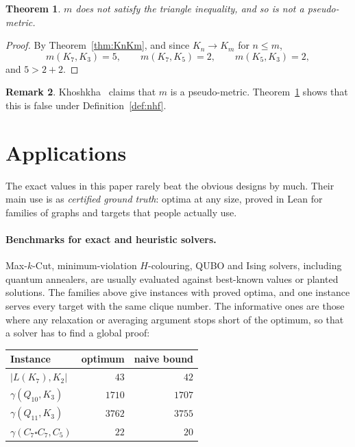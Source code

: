 \documentclass{article}
\newtheorem{theorem}{Theorem}[section]
\theoremstyle{definition}
\newtheorem{remark}[theorem]{Remark}
\begin{document}
\begin{theorem}
\label{thm:no_triangle}
$m$ does not satisfy the triangle inequality, and so is not a pseudo-metric.
\end{theorem}

\begin{proof}
By Theorem~\ref{thm:KnKm}, and since $K_n\to K_m$ for $n\le m$,
\[
  m(K_7,K_3)=5,\qquad m(K_7,K_5)=2,\qquad m(K_5,K_3)=2,
\]
and $5>2+2$.
\end{proof}

\begin{remark}
Khoshkha~\cite{khoshkha2005} claims that $m$ is a pseudo-metric.
Theorem~\ref{thm:no_triangle} shows that this is false under
Definition~\ref{def:nhf}.
\end{remark}

\section{Applications}
\label{sec:applications}

The exact values in this paper rarely beat the obvious designs by much.  Their
main use is as \emph{certified ground truth}: optima at any size, proved in Lean
for families of graphs and targets that people actually use.

\paragraph{Benchmarks for exact and heuristic solvers.}
Max-$k$-Cut, minimum-violation $H$-colouring, QUBO and Ising solvers, including
quantum annealers, are usually evaluated against best-known values or planted
solutions.  The families above give instances with proved optima, and one
instance serves every target with the same clique number.  The informative ones
are those where any relaxation or averaging argument stops short of the optimum,
so that a solver has to find a global proof:

\begin{center}
\begin{tabular}{lrr}
\toprule
Instance & optimum & naive bound \\
\midrule
$|L(K_7),K_2|$ & $43$ & $42$ \\
$\gamma(Q_{10},K_3)$ & $1710$ & $1707$ \\
$\gamma(Q_{11},K_3)$ & $3762$ & $3755$ \\
$\gamma(C_7\square C_7,C_5)$ & $22$ & $20$ \\
\bottomrule
\end{tabular}
\end{center}
\end{document}
